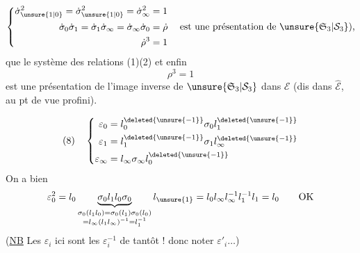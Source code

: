 \[
\left\{\begin{aligned}
\dot\sigma_{\unsure{1|0}}^2=\dot\sigma_{\unsure{1|0}}^2=\dot\sigma_\infty^2&=1\\
\dot\sigma_0\dot\sigma_1=\dot\sigma_1\dot\sigma_\infty=\dot\sigma_\infty\dot\sigma_0&=\dot\rho\\
\dot\rho^3&=1
\end{aligned}\right.
\quad\text{est une présentation de }\unsure{\mathfrak S_3|\mathcal S_3}\text{),}
\]
que le système des relations (1)(2) et enfin
\[
\rho^3=1
\]
est une présentation de l'image inverse de $\unsure{\mathfrak S_3|\mathcal S_3}$ dans $\mathcal E$ (dis dans $\widehat{\mathcal E}$, au pt de vue profini).

\[
(8)\quad\left\{\begin{aligned}
\varepsilon_0&=l_0^{\deleted{\unsure{-1}}}\sigma_0l_1^{\deleted{\unsure{-1}}}\\
\varepsilon_1&=l_1^{\deleted{\unsure{-1}}}\sigma_1l_\infty^{\deleted{\unsure{-1}}}\\
\varepsilon_\infty&=l_\infty\sigma_\infty l_0^{\deleted{\unsure{-1}}}
\end{aligned}\right.
\]
On a bien
\[
\varepsilon_0^2=l_0\underbrace{\sigma_0l_1l_0\sigma_0}_{\substack{\sigma_0(l_1l_0)=\sigma_0(l_1)\sigma_0(l_0)\\=l_\infty(l_1l_\infty)^{-1}=l_1^{-1}}}l_{\unsure{1}}=l_0l_\infty l_\infty^{-1}l_1^{-1}l_1=l_0\qquad\text{OK}
\]
(\uline{NB} Les $\varepsilon_i$ ici sont les $\varepsilon_i^{-1}$ de tantôt !    donc noter $\varepsilon'_i\ldots$)

